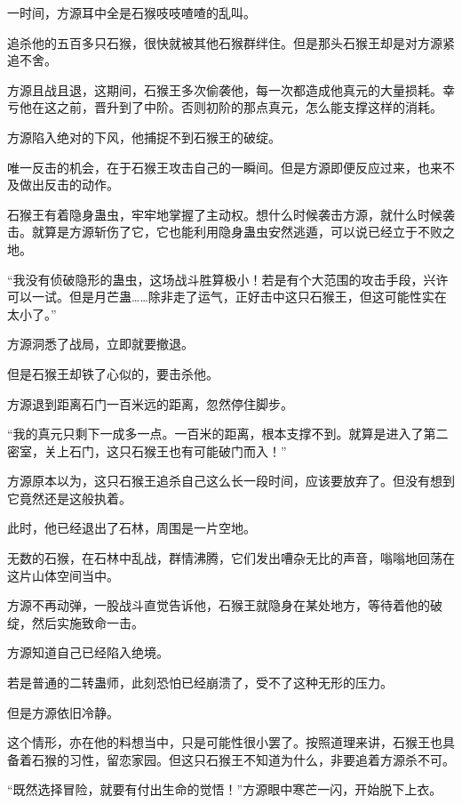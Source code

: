 \begin{this_body}
一时间，方源耳中全是石猴吱吱喳喳的乱叫。

追杀他的五百多只石猴，很快就被其他石猴群绊住。但是那头石猴王却是对方源紧追不舍。

方源且战且退，这期间，石猴王多次偷袭他，每一次都造成他真元的大量损耗。幸亏他在这之前，晋升到了中阶。否则初阶的那点真元，怎么能支撑这样的消耗。

方源陷入绝对的下风，他捕捉不到石猴王的破绽。

唯一反击的机会，在于石猴王攻击自己的一瞬间。但是方源即便反应过来，也来不及做出反击的动作。

石猴王有着隐身蛊虫，牢牢地掌握了主动权。想什么时候袭击方源，就什么时候袭击。就算是方源斩伤了它，它也能利用隐身蛊虫安然逃遁，可以说已经立于不败之地。

“我没有侦破隐形的蛊虫，这场战斗胜算极小！若是有个大范围的攻击手段，兴许可以一试。但是月芒蛊……除非走了运气，正好击中这只石猴王，但这可能性实在太小了。”

方源洞悉了战局，立即就要撤退。

但是石猴王却铁了心似的，要击杀他。

方源退到距离石门一百米远的距离，忽然停住脚步。

“我的真元只剩下一成多一点。一百米的距离，根本支撑不到。就算是进入了第二密室，关上石门，这只石猴王也有可能破门而入！”

方源原本以为，这只石猴王追杀自己这么长一段时间，应该要放弃了。但没有想到它竟然还是这般执着。

此时，他已经退出了石林，周围是一片空地。

无数的石猴，在石林中乱战，群情沸腾，它们发出嘈杂无比的声音，嗡嗡地回荡在这片山体空间当中。

方源不再动弹，一股战斗直觉告诉他，石猴王就隐身在某处地方，等待着他的破绽，然后实施致命一击。

方源知道自己已经陷入绝境。

若是普通的二转蛊师，此刻恐怕已经崩溃了，受不了这种无形的压力。

但是方源依旧冷静。

这个情形，亦在他的料想当中，只是可能性很小罢了。按照道理来讲，石猴王也具备着石猴的习性，留恋家园。但这只石猴王不知道为什么，非要追着方源杀不可。

“既然选择冒险，就要有付出生命的觉悟！”方源眼中寒芒一闪，开始脱下上衣。

\end{this_body}

